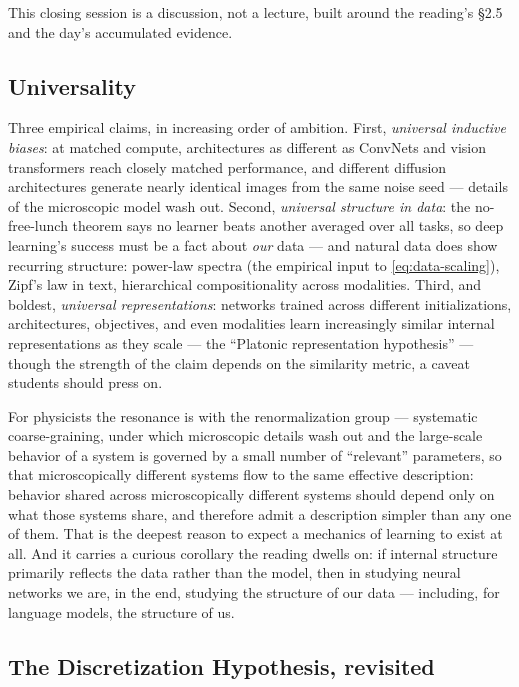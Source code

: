 \documentclass[11pt]{article}
\begin{document}
This closing session is a discussion, not a lecture, built around the
reading's \S2.5 and the day's accumulated evidence.

\subsection{Universality}

Three empirical claims, in increasing order of ambition. First,
\emph{universal inductive biases}: at matched compute, architectures as
different as ConvNets and vision transformers reach closely matched
performance, and different diffusion architectures generate nearly identical
images from the same noise seed --- details of the microscopic model wash
out. Second, \emph{universal structure in data}: the no-free-lunch theorem
says no learner beats another averaged over all tasks, so deep learning's
success must be a fact about \emph{our} data --- and natural data does show
recurring structure: power-law spectra (the empirical input to
\cref{eq:data-scaling}), Zipf's law in text, hierarchical compositionality
across modalities. Third, and boldest, \emph{universal representations}:
networks trained across different initializations, architectures,
objectives, and even modalities learn increasingly similar internal
representations as they scale --- the ``Platonic representation hypothesis''
\cite{huh2024platonic} --- though the strength of the claim depends on the
similarity metric, a caveat students should press on.

For physicists the resonance is with the renormalization group ---
systematic coarse-graining, under which microscopic details wash out and
the large-scale behavior of a system is governed by a small number of
``relevant'' parameters, so that microscopically different systems flow to
the same effective description: behavior shared across microscopically
different systems should depend only on what those systems share, and
therefore admit a description simpler than any one of them. That is the deepest reason to expect a mechanics of learning to
exist at all. And it carries a curious corollary the reading dwells on: if
internal structure primarily reflects the data rather than the model, then
in studying neural networks we are, in the end, studying the structure of
our data --- including, for language models, the structure of us.

\subsection{The Discretization Hypothesis, revisited}
\end{document}
